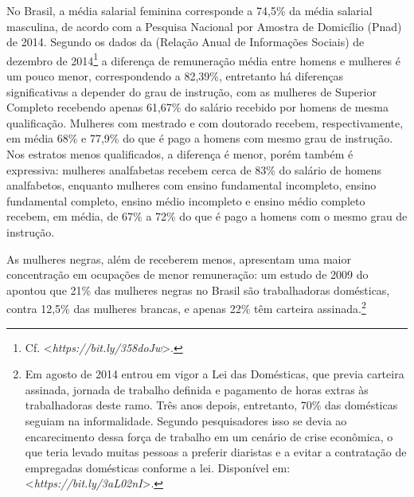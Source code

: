 No Brasil, a média salarial feminina corresponde a 74,5\% da média
salarial masculina, de acordo com a Pesquisa Nacional por Amostra de
Domicílio (Pnad) de 2014. Segundo os dados da  (Relação Anual de
Informações Sociais) de dezembro de 2014\footnote{Cf.
  \textless{}\emph{https://bit.ly/358doJw}\textgreater{}.}
a diferença de remuneração média entre homens e mulheres é um pouco
menor, correspondendo a 82,39\%, entretanto há diferenças significativas
a depender do grau de instrução, com as mulheres de Superior Completo
recebendo apenas 61,67\% do salário recebido por homens de mesma
qualificação. Mulheres com mestrado e com doutorado recebem,
respectivamente, em média 68\% e 77,9\% do que é pago a homens com mesmo
grau de instrução. Nos estratos menos qualificados, a diferença é menor,
porém também é expressiva: mulheres analfabetas recebem cerca de 83\% do
salário de homens analfabetos, enquanto mulheres com ensino fundamental
incompleto, ensino fundamental completo, ensino médio incompleto e
ensino médio completo recebem, em média, de 67\% a 72\% do que é pago a
homens com o mesmo grau de instrução.

As mulheres negras, além de receberem menos, apresentam uma maior
concentração em ocupações de menor remuneração: um estudo de 2009 do
 apontou que 21\% das mulheres negras no Brasil são trabalhadoras
domésticas, contra 12,5\% das mulheres brancas, e apenas 22\% têm
carteira assinada.\footnote{Em agosto de 2014 entrou em vigor a Lei das
  Domésticas, que previa carteira assinada, jornada de trabalho definida
  e pagamento de horas extras às trabalhadoras deste ramo. Três anos
  depois, entretanto, 70\% das domésticas seguiam na informalidade.
  Segundo pesquisadores isso se devia ao encarecimento dessa força de
  trabalho em um cenário de crise econômica, o que teria levado muitas
  pessoas a preferir diaristas e a evitar a contratação de empregadas
  domésticas conforme a lei. Disponível em:
  \textless{}\emph{https://bit.ly/3aL02nI}\textgreater{}.}

